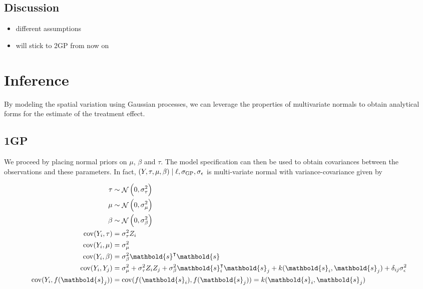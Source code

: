 \documentclass[letter]{article}
\providecommand{\tightlist}{%
      \setlength{\itemsep}{0pt}\setlength{\parskip}{0pt}}
\DeclareMathOperator{\cov}{{cov}}
\DeclareMathOperator{\normal}{\mathcal{N}}
\newcommand{\trans}{^{\intercal}}
\newcommand{\sigmaf}{\sigma_{\mathrm{GP}}}
\newcommand{\sigman}{\sigma_{\epsilon}}
\newcommand{\sigmatau}{\sigma_{\tau}}
\newcommand{\sigmabeta}{\sigma_{\beta}}
\newcommand{\sigmamu}{\sigma_{\mu}}
\newcommand{\svec}{\mathbold{s}}
\providecommand{\tightlist}{%
  	  \setlength{\itemsep}{0pt}\setlength{\parskip}{0pt}}
\begin{document}
    	\subsection{Discussion}\label{discussion}

\begin{itemize}
\tightlist
\item
  different assumptions
\item
  will stick to 2GP from now on
\end{itemize}
    


    	\section{Inference}\label{inference}

By modeling the spatial variation using Gaussian processes, we can leverage the properties of multivariate normals to obtain analytical forms for the estimate of the treatment effect.
    


    	\subsection{1GP}\label{gp}

We proceed by placing normal priors on \(\mu\), \(\beta\) and \(\tau\). The model specification can then be used to obtain covariances between the observations and these parameters. In fact, \(\del{Y,\tau,\mu,\beta} \mid \ell,\sigmaf, \sigman\) is multi-variate normal with variance-covariance given by

\begin{equation}
\begin{split}
    \tau  &\sim \normal\del{0,\sigmatau^2} \\
    \mu   &\sim \normal\del{0,\sigmamu^2} \\
    \beta &\sim \normal\del{0,\sigmabeta^2} \\
    \cov(Y_i,\tau) &= \sigmatau^2 Z_i \\
    \cov(Y_i,\mu)  &= \sigmamu^2 \\
    \cov(Y_i,\beta)&= \sigmabeta^2 \svec\trans \svec \\
    \cov(Y_i,Y_j)&= \sigmamu^2 + \sigmatau^2 Z_i Z_j + \sigmabeta^2 \svec_i\trans \svec_j + k(\svec_i,\svec_j) + \delta_{ij}\sigman^2\\
    \cov(Y_i,f(\svec_j)) &= \cov(f(\svec_i),f(\svec_j)) = k(\svec_i,\svec_j)
\end{split}
\end{equation}
\end{document}
